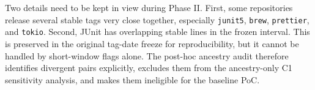 Two details need to be kept in view during Phase II. First, some repositories release several
stable tags very close together, especially \texttt{junit5}, \texttt{brew}, \texttt{prettier},
and \texttt{tokio}. Second, JUnit has overlapping stable lines in the frozen interval. This is
preserved in the original tag-date freeze for reproducibility, but it cannot be handled by short-window flags alone.
The post-hoc ancestry audit therefore identifies divergent pairs explicitly, excludes them from the ancestry-only C1
sensitivity analysis, and makes them ineligible for the baseline PoC.
